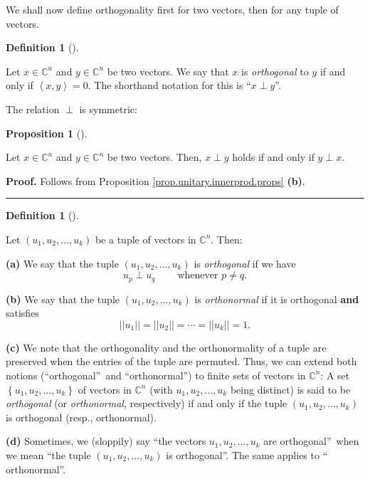 \documentclass[numbers=enddot,12pt,final,onecolumn,notitlepage]{scrartcl}%
\numberwithin{exer}{subsection}
\theoremstyle{definition}
\newtheorem{prop}[theo]{Proposition}
\newenvironment{proposition}[1][]
{\begin{prop}[#1]\begin{leftbar}}
{\end{leftbar}\end{prop}}
\newtheorem{defi}[theo]{Definition}
\newenvironment{definition}[1][]
{\begin{defi}[#1]\begin{leftbar}}
{\end{leftbar}\end{defi}}
\newenvironment{proof}[1][Proof]{\noindent\textbf{#1.} }{\ \rule{0.5em}{0.5em}}
\begin{document}
We shall now define orthogonality first for two vectors, then for any tuple of vectors.

\begin{definition}
\label{def.unitary.innerprod.orth}Let $x\in\mathbb{C}^{n}$ and $y\in
\mathbb{C}^{n}$ be two vectors. We say that $x$ is \emph{orthogonal} to $y$ if
and only if $\left\langle x,y\right\rangle =0$. The shorthand notation for
this is \textquotedblleft$x\perp y$\textquotedblright.
\end{definition}

The relation $\perp$ is symmetric:

\begin{proposition}
\label{prop.unitary.innerprod.orth-symm}Let $x\in\mathbb{C}^{n}$ and
$y\in\mathbb{C}^{n}$ be two vectors. Then, $x\perp y$ holds if and only if
$y\perp x$.
\end{proposition}

\begin{proof}
Follows from Proposition \ref{prop.unitary.innerprod.props} \textbf{(b)}.
\end{proof}

\begin{definition}
\label{def.unitary.innerprod.orth-n}Let $\left(  u_{1},u_{2},\ldots
,u_{k}\right)  $ be a tuple of vectors in $\mathbb{C}^{n}$. Then:

\textbf{(a)} We say that the tuple $\left(  u_{1},u_{2},\ldots,u_{k}\right)  $
is \emph{orthogonal} if we have
\[
u_{p}\perp u_{q}\ \ \ \ \ \ \ \ \ \ \text{whenever }p\neq q.
\]


\textbf{(b)} We say that the tuple $\left(  u_{1},u_{2},\ldots,u_{k}\right)  $
is \emph{orthonormal} if it is orthogonal \textbf{and} satisfies%
\[
\left\vert \left\vert u_{1}\right\vert \right\vert =\left\vert \left\vert
u_{2}\right\vert \right\vert =\cdots=\left\vert \left\vert u_{k}\right\vert
\right\vert =1.
\]


\textbf{(c)} We note that the orthogonality and the orthonormality of a tuple
are preserved when the entries of the tuple are permuted. Thus, we can extend
both notions (\textquotedblleft orthogonal\textquotedblright\ and
\textquotedblleft orthonormal\textquotedblright) to finite sets of vectors in
$\mathbb{C}^{n}$: A set $\left\{  u_{1},u_{2},\ldots,u_{k}\right\}  $ of
vectors in $\mathbb{C}^{n}$ (with $u_{1},u_{2},\ldots,u_{k}$ being distinct)
is said to be \emph{orthogonal} (or \emph{orthonormal}, respectively) if and
only if the tuple $\left(  u_{1},u_{2},\ldots,u_{k}\right)  $ is orthogonal
(resp., orthonormal).

\textbf{(d)} Sometimes, we (sloppily) say \textquotedblleft the vectors
$u_{1},u_{2},\ldots,u_{k}$ are orthogonal\textquotedblright\ when we mean
\textquotedblleft the tuple $\left(  u_{1},u_{2},\ldots,u_{k}\right)  $ is
orthogonal\textquotedblright. The same applies to \textquotedblleft
orthonormal\textquotedblright.
\end{definition}
\end{document}
